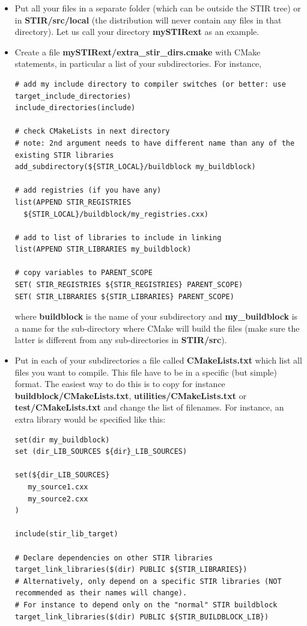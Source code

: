 \documentclass{article}
\begin{document}
\begin{itemize}
\item Put all your files in a separate folder (which can be outside the STIR tree) or in \textbf{STIR/src/local} (the distribution 
will never contain any files in that directory). Let us call your directory 
\textbf{mySTIRext} as an example.
\item Create a file \textbf{mySTIRext/extra\_stir\_dirs.cmake} with CMake statements,
in particular a list of your subdirectories. For instance,
\begin{verbatim}
# add my include directory to compiler switches (or better: use target_include_directories)
include_directories(include)

# check CMakeLists in next directory
# note: 2nd argument needs to have different name than any of the existing STIR libraries
add_subdirectory(${STIR_LOCAL}/buildblock my_buildblock)

# add registries (if you have any)
list(APPEND STIR_REGISTRIES 
  ${STIR_LOCAL}/buildblock/my_registries.cxx)

# add to list of libraries to include in linking
list(APPEND STIR_LIBRARIES my_buildblock)

# copy variables to PARENT_SCOPE
SET( STIR_REGISTRIES ${STIR_REGISTRIES} PARENT_SCOPE)
SET( STIR_LIBRARIES ${STIR_LIBRARIES} PARENT_SCOPE)

\end{verbatim}
where \textbf{buildblock} is the name of your subdirectory and \textbf{my\_buildblock} is a name for the
sub-directory where CMake will build the files (make sure the latter is different from any
sub-directories in \textbf{STIR/src}).

\item Put in each of your subdirectories a file called \textbf{CMakeLists.txt}
which list all files you want to compile. This file have to 
be in a specific (but simple) format. The easiest way to do this 
is to copy for instance \textbf{buildblock/CMakeLists.txt}, \textbf{utilities/CMakeLists.txt}
or  \textbf{test/CMakeLists.txt} and change the list of filenames. For instance, an extra library
would be specified like this:
\begin{verbatim}
set(dir my_buildblock)
set (dir_LIB_SOURCES ${dir}_LIB_SOURCES)

set(${dir_LIB_SOURCES}
   my_source1.cxx
   my_source2.cxx
)

include(stir_lib_target)

# Declare dependencies on other STIR libraries
target_link_libraries($(dir) PUBLIC ${STIR_LIBRARIES})
# Alternatively, only depend on a specific STIR libraries (NOT recommended as their names will change).
# For instance to depend only on the "normal" STIR buildblock
target_link_libraries($(dir) PUBLIC ${STIR_BUILDBLOCK_LIB})
\end{verbatim}


\end{itemize}
\end{document}
